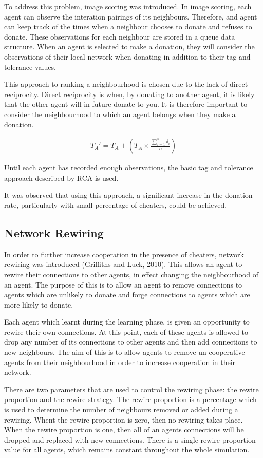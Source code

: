 To address this problem, image scoring was introduced.
In image scoring, each agent can observe the interation pairings of its neighbours.
Therefore,
and agent can keep track of the times when a neighbour chooses to donate and refuses to donate.
These observations for each neighbour are stored in a queue data structure.
When an agent is selected to make a donation, they will consider the observations of their local network
when donating in addition to their tag and tolerance values.

This approach to ranking a neighbourhood is chosen
due to the lack of direct reciprocity.
Direct reciprocity is when, by donating to another agent, it is likely that the other agent will in future donate to you.
It is therefore important to consider the neighbourhood to which an agent belongs when they make a donation.

\begin{align*}
    T_A' = T_A + \left(T_A \times \frac{\sum_{i = 1}^{n}\delta_i}{n}\right)
\end{align*}

Until each agent has recorded enough observations,
the basic tag and tolerance approach described by RCA is used.

It was observed that using this approach,
a significant increase in the donation rate, particularly
with small percentage of cheaters, could be achieved.

\subsection{Network Rewiring}

In order to further increase cooperation
in the presence of cheaters, network rewiring was introduced (Griffiths and Luck, 2010).
This allows an agent to rewire their connections to other agents,
in effect changing the neighbourhood of an agent.
The purpose of this is to allow an agent to remove connections
to agents which are unlikely to donate and forge connections to agents
which are more likely to donate.

Each agent which learnt during the learning phase,
is given an opportunity to rewire their own connections.
At this point, each of these agents is allowed to drop any number of its
connections to other agents and then add connections to new neighbours.
The aim of this is to allow agents to remove un-cooperative agents from
their neighbourhood in order to increase cooperation in their network.

There are two parameters that are used to control the rewiring phase:
the rewire proportion and the rewire strategy.
The rewire proportion is a percentage which is used to determine the number of
neighbours removed or added during a rewiring.
Whent the rewire proportion is zero, then no rewiring takes place.
When the rewire proportion is one, then all of an agents connections will be dropped and replaced with new connections.
There is a single rewire proportion value for all agents, which remains constant throughout the whole simulation.

